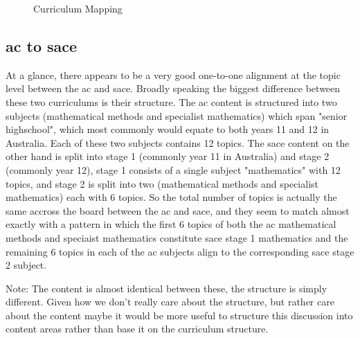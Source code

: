 \documentclass[twoside,12pt,a4paper]{report}
\begin{document}
\clearpage

\pagestyle{empty}

\begin{figure}[p]
\begin{center}

\caption{Curriculum Mapping\label{fig:mapping}}
\end{center}
\end{figure}

\clearpage

\subsection{\gls{ac} to \gls{sace}}

At a glance, there appears to be a very good one-to-one alignment at the topic level between the \gls{ac} and \gls{sace}. Broadly speaking the biggest difference between these two curriculums is their structure. The \gls{ac} content is structured into two subjects (mathematical methods and specialist mathematics) which span "senior highschool", which most commonly would equate to both years 11 and 12 in Australia. Each of these two subjects contains 12 topics. The \gls{sace} content on the other hand is split into stage 1 (commonly year 11 in Australia) and stage 2 (commonly year 12), stage 1 consists of a single subject "mathematics" with 12 topics, and stage 2 is split into two (mathematical methods and specialist mathematics) each with 6 topics. So the total number of topics is actually the same accross the board between the \gls{ac} and \gls{sace}, and they seem to match almost exactly with a pattern in which the first 6 topics of both the \gls{ac} mathematical methods and speciaist mathematics constitute \gls{sace} stage 1 mathematics and the remaining 6 topics in each of the \gls{ac} subjects align to the corresponding \gls{sace} stage 2 subject.

Note: The content is almost identical between these, the structure is simply different. Given how we don't really care about the structure, but rather care about the content maybe it would be more useful to structure this discussion into content areas rather than base it on the curriculum structure.
\end{document}
